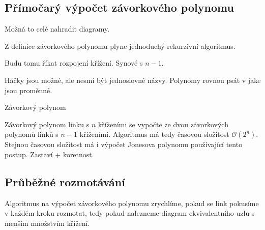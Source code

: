 \subsection{Přímočarý výpočet závorkového polynomu}

Možná to celé nahradit diagramy.

Z definice závorkového polynomu plyne jednoduchý rekurzivní algoritmus.

Budu tomu říkat rozpojení křížení. Synové s $n-1$.

Háčky jsou možné, ale nesmí být jednoslovné názvy.
Polynomy rovnou psát v jake jsou proměnné.

\begin{algorithm}[H]

\DontPrintSemicolon

%




\caption{Závorkový polynom} 
\end{algorithm}

Závorkový polynom linku s $n$ kříženími se vypočte ze dvou závorkových polynomů linků s $n-1$ kříženími. Algoritmus má tedy časovou složitost $\mathcal{O}(2^n)$. Stejnou časovou složitost má i výpočet Jonesova polynomu používající tento postup.
Zastaví + koretnost.


\subsection{Průběžné rozmotávání}
Algoritmus na výpočet závorkového polynomu zrychlíme, pokud se link pokusíme v každém kroku rozmotat, tedy pokud nalezneme diagram ekvivalentního uzlu s menším množstvím křížení. 

